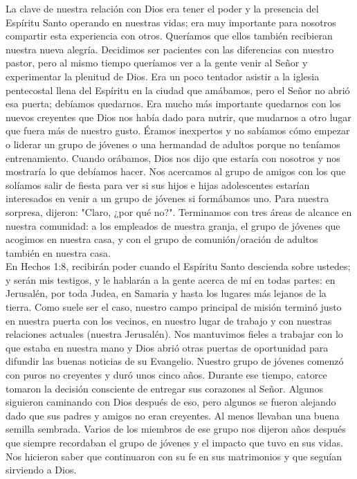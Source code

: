 \documentclass[twoside, 12pt]{book}
\begin{document}
La clave de nuestra relación con Dios era tener el poder y la presencia del Espíritu Santo operando en nuestras vidas; era muy importante para nosotros compartir esta experiencia con otros. Queríamos que ellos también recibieran nuestra nueva alegría. Decidimos ser pacientes con las diferencias con nuestro pastor, pero al mismo tiempo queríamos ver a la gente venir al Señor y experimentar la plenitud de Dios. Era un poco tentador asistir a la iglesia pentecostal llena del Espíritu en la ciudad que amábamos, pero el Señor no abrió esa puerta; debíamos quedarnos. Era mucho más importante quedarnos con los nuevos creyentes que Dios nos había dado para nutrir, que mudarnos a otro lugar que fuera más de nuestro gusto. Éramos inexpertos y no sabíamos cómo empezar o liderar un grupo de jóvenes o una hermandad de adultos porque no teníamos entrenamiento. Cuando orábamos, Dios nos dijo que estaría con nosotros y nos mostraría lo que debíamos hacer. Nos acercamos al grupo de amigos con los que solíamos salir de fiesta para ver si sus hijos e hijas adolescentes estarían interesados en venir a un grupo de jóvenes si formábamos uno. Para nuestra sorpresa, dijeron: "Claro, ¿por qué no?". Terminamos con tres áreas de alcance en nuestra comunidad: a los empleados de nuestra granja, el grupo de jóvenes que acogimos en nuestra casa, y con el grupo de comunión/oración de adultos también en nuestra casa.\\

En Hechos 1:8, recibirán poder cuando el Espíritu Santo descienda sobre ustedes; y serán mis testigos, y le hablarán a la gente acerca de mí en todas partes: en Jerusalén, por toda Judea, en Samaria y hasta los lugares más lejanos de la tierra. Como suele ser el caso, nuestro campo principal de misión terminó justo en nuestra puerta con los vecinos, en nuestro lugar de trabajo y con nuestras relaciones actuales (nuestra Jerusalén). Nos mantuvimos fieles a trabajar con lo que estaba en nuestra mano y Dios abrió otras puertas de oportunidad para difundir las buenas noticias de su Evangelio. Nuestro grupo de jóvenes comenzó con puros no creyentes y duró unos cinco años. Durante ese tiempo, catorce tomaron la decisión consciente de entregar sus corazones al Señor. Algunos siguieron caminando con Dios después de eso, pero algunos se fueron alejando dado que sus padres y amigos no eran creyentes. Al menos llevaban una buena semilla sembrada. Varios de los miembros de ese grupo nos dijeron años después que siempre recordaban el grupo de jóvenes y el impacto que tuvo en sus vidas. Nos hicieron saber que continuaron con su fe en sus matrimonios y que seguían sirviendo a Dios.\\
\end{document}
